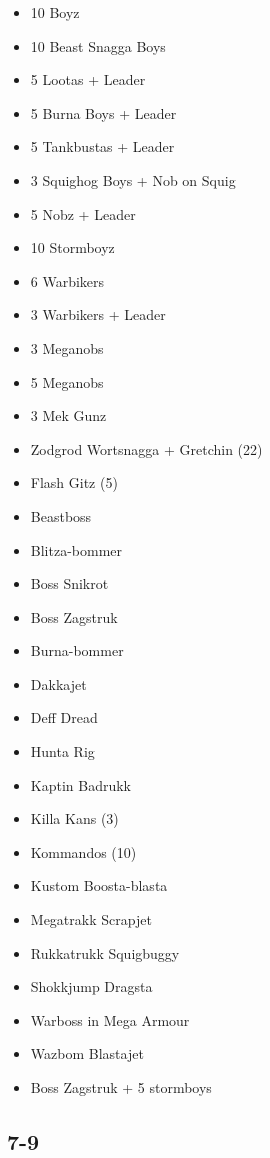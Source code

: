 \documentclass{HordeModeTarot}
\begin{document}
\begin{multicols}{2}
\begin{itemize}[leftmargin=*]
\item[] 10 Boyz
\item[] 10 Beast Snagga Boys
\item[] 5 Lootas + Leader
\item[] 5 Burna Boys + Leader
\item[] 5 Tankbustas + Leader
\item[] 3 Squighog Boys + Nob on Squig
\item[] 5 Nobz + Leader
\item[] 10 Stormboyz
\item[] 6 Warbikers
\item[] 3 Warbikers + Leader
\item[] 3 Meganobs
\item[] 5 Meganobs
\item[] 3 Mek Gunz
\item[] Zodgrod Wortsnagga + Gretchin (22)
\item[] Flash Gitz (5)
\item[] Beastboss
\item[] Blitza-bommer
\item[] Boss Snikrot
\item[] Boss Zagstruk
\item[] Burna-bommer
\item[] Dakkajet
\item[] Deff Dread
\item[] Hunta Rig
\item[] Kaptin Badrukk
\item[] Killa Kans (3)
\item[] Kommandos (10)
\item[] Kustom Boosta-blasta
\item[] Megatrakk Scrapjet
\item[] Rukkatrukk Squigbuggy
\item[] Shokkjump Dragsta
\item[] Warboss in Mega Armour
\item[] Wazbom Blastajet
\item[] Boss Zagstruk + 5 stormboys
\end{itemize}

\subsection*{7-9}


\end{multicols}
\end{document}
